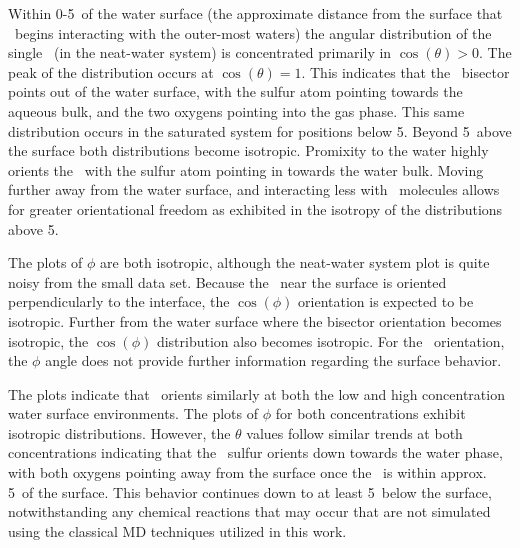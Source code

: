 Within 0-5\angs~of the water surface (the approximate distance from the surface that \suldiox~begins interacting with the outer-most waters) the angular distribution of the single \suldiox~(in the neat-water system) is concentrated primarily in $\cos(\theta)>0$. The peak of the distribution occurs at $\cos(\theta)=1$. This indicates that the \suldiox~bisector points out of the water surface, with the sulfur atom pointing towards the aqueous bulk, and the two oxygens pointing into the gas phase. This same distribution occurs in the saturated system for positions below 5\angs. Beyond 5\angs~above the surface both distributions become isotropic. Promixity to the water highly orients the \suldiox~with the sulfur atom pointing in towards the water bulk. Moving further away from the water surface, and interacting less with \wat~molecules allows for greater orientational freedom as exhibited in the isotropy of the distributions above 5\angs. %

The plots of $\phi$ are both isotropic, although the neat-water system plot is quite noisy from the small data set. Because the \suldiox~near the surface is oriented perpendicularly to the interface, the $\cos(\phi)$ orientation is expected to be isotropic. Further from the water surface where the bisector orientation becomes isotropic, the $\cos(\phi)$ distribution also becomes isotropic. For the \suldiox~orientation, the $\phi$ angle does not provide further information regarding the surface behavior.

The plots indicate that \suldiox~orients similarly at both the low and high concentration water surface environments. The plots of $\phi$ for both concentrations exhibit isotropic distributions. However, the $\theta$ values follow similar trends at both concentrations indicating that the \suldiox~sulfur orients down towards the water phase, with both oxygens pointing away from the surface once the \suldiox~is within approx. 5\angs~of the surface. This behavior continues down to at least 5\angs~below the surface, notwithstanding any chemical reactions that may occur that are not simulated using the classical MD techniques utilized in this work.

